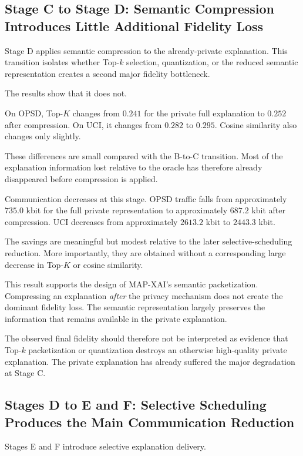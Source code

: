 \documentclass[11pt]{article}
\begin{document}
\subsection{Stage C to Stage D: Semantic Compression Introduces Little Additional Fidelity Loss}

Stage D applies semantic compression to the already-private explanation. This transition isolates whether Top-\(k\) selection, quantization, or the reduced semantic representation creates a second major fidelity bottleneck.

The results show that it does not.

On OPSD, Top-$K$ changes from \(0.241\) for the private full explanation to \(0.252\) after compression. On UCI, it changes from \(0.282\) to \(0.295\). Cosine similarity also changes only slightly.

These differences are small compared with the B-to-C transition. Most of the explanation information lost relative to the oracle has therefore already disappeared before compression is applied.

Communication decreases at this stage. OPSD traffic falls from approximately \(735.0\) kbit for the full private representation to approximately \(687.2\) kbit after compression. UCI decreases from approximately \(2613.2\) kbit to \(2443.3\) kbit.

The savings are meaningful but modest relative to the later selective-scheduling reduction. More importantly, they are obtained without a corresponding large decrease in Top-$K$ or cosine similarity.

This result supports the design of MAP-XAI's semantic packetization. Compressing an explanation \emph{after} the privacy mechanism does not create the dominant fidelity loss. The semantic representation largely preserves the information that remains available in the private explanation.

The observed final fidelity should therefore not be interpreted as evidence that Top-\(k\) packetization or quantization destroys an otherwise high-quality private explanation. The private explanation has already suffered the major degradation at Stage C.

\subsection{Stages D to E and F: Selective Scheduling Produces the Main Communication Reduction}

Stages E and F introduce selective explanation delivery.
\end{document}

